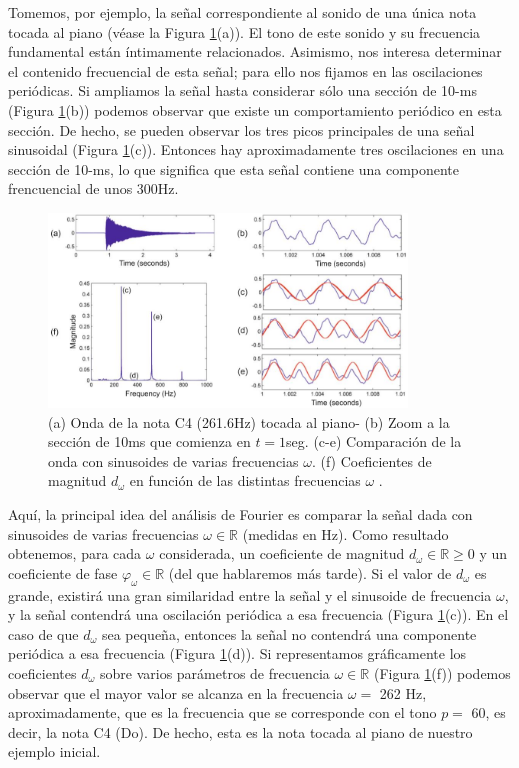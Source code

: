 \documentclass{article}
\begin{document}
Tomemos, por ejemplo, la señal correspondiente al sonido de una única nota tocada al piano (véase la Figura \ref{fig:6.1}(a)). El tono de este sonido y su frecuencia fundamental están íntimamente relacionados. Asimismo, nos interesa determinar el contenido frecuencial de esta señal; para ello nos fijamos en las oscilaciones periódicas. Si ampliamos la señal hasta considerar sólo una sección de 10-ms (Figura \ref{fig:6.1}(b)) podemos observar que existe un comportamiento periódico en esta sección. De hecho, se pueden observar los tres picos principales de una señal sinusoidal (Figura \ref{fig:6.1}(c)). Entonces hay aproximadamente tres oscilaciones en una sección de 10-ms, lo que significa que esta señal contiene una componente frencuencial de unos 300Hz.

\begin{figure}[H]
\centering
    \includegraphics[width=0.85\textwidth]{images/81.jpeg}
    \caption{(a) Onda de la nota C4 (261.6Hz) tocada al piano- (b) Zoom a la sección de 10ms que comienza en $t=1$seg. (c-e) Comparación de la onda con sinusoides de varias frecuencias $\omega$. (f) Coeficientes de magnitud $d_\omega$ en función de las distintas frecuencias $\omega$ \cite[Capítulo 2]{muller2015fundamentals}.}
  \label{fig:6.1}
\end{figure}

Aquí, la principal idea del análisis de Fourier es comparar la señal dada con sinusoides de varias frecuencias $\omega\in\mathbb{R}$ (medidas en Hz). Como resultado obtenemos, para cada $\omega$ considerada, un coeficiente de magnitud $d_{\omega}\in\mathbb{R}\geq0$ y un coeficiente de fase $\varphi_{\omega}\in\mathbb{R}$ (del que hablaremos más tarde). Si el valor de $d_{\omega}$ es grande, existirá una gran similaridad entre la señal y el sinusoide de frecuencia $\omega$, y la señal contendrá una oscilación periódica a esa frecuencia (Figura \ref{fig:6.1}(c)). En el caso de que $d_{\omega}$ sea pequeña, entonces la señal no contendrá una componente periódica a esa frecuencia (Figura \ref{fig:6.1}(d)). Si representamos gráficamente los coeficientes $d_{\omega}$ sobre varios parámetros de frecuencia $\omega\in\mathbb{R}$ (Figura \ref{fig:6.1}(f)) podemos observar que el mayor valor se alcanza en la frecuencia $\omega=$ 262 Hz, aproximadamente, que es la frecuencia que se corresponde con el tono $p =$ 60, es decir, la nota C4 (Do). De hecho, esta es la nota tocada al piano de nuestro ejemplo inicial.
\end{document}

